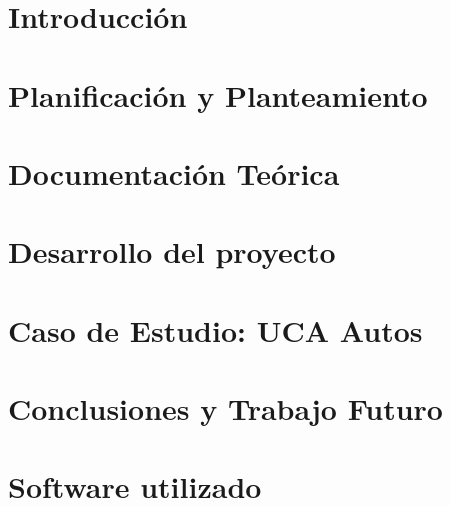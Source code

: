 \documentclass[a4paper,11pt]{book}
\begin{document}
\renewcommand{\listfigurename}{Indice de figuras}
\renewcommand{\tablename}{Tabla}
\renewcommand{\listtablename}{Indice de tablas}


\pagestyle{empty}

\cleardoublepage


\cleardoublepage
\pagestyle{plain}

\frontmatter %


\cleardoublepage

\tableofcontents
\listoffigures

\mainmatter %

\chapter{Introducción}


\chapter{Planificación y Planteamiento}


\chapter{Documentación Teórica}


\chapter{Desarrollo del proyecto}


\chapter{Caso de Estudio: UCA Autos}





\chapter{Conclusiones y Trabajo Futuro}


\backmatter %

\cleardoublepage

\chapter{Software utilizado}

\end{document}
